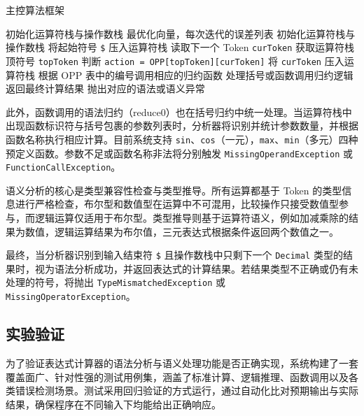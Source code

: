 \documentclass[a4paper, twoside, utf8]{ctexart}
\begin{document}
\begin{algorithm}
        \caption{主控算法框架}
        \begin{algorithmic}[1]
            \Require 初始化运算符栈与操作数栈
            \Ensure 最优化向量，每次迭代的误差列表
            \State 初始化运算符栈与操作数栈
            \State 将起始符号 \verb|$| 压入运算符栈
            \Loop
            \State 读取下一个 Token \verb|curToken|
            \State 获取运算符栈顶符号 \verb|topToken|
            \State 判断 \verb|action = OPP[topToken][curToken]|
            \State 将 \verb|curToken| 压入运算符栈
            \EndIf
            \State 根据 OPP 表中的编号调用相应的归约函数
            \EndIf
            \State 处理括号或函数调用归约逻辑
            \EndIf
            \State 返回最终计算结果
            \EndIf
            \State 抛出对应的语法或语义异常
            \EndIf
            \EndLoop
        \end{algorithmic}
    \end{algorithm}
    
    此外，函数调用的语法归约（reduce0）也在括号归约中统一处理。当运算符栈中出现函数标识符与括号包裹的参数列表时，分析器将识别并统计参数数量，并根据函数名称执行相应计算。目前系统支持 \verb|sin|、\verb|cos|（一元），\verb|max|、\verb|min|（多元）四种预定义函数。参数不足或函数名称非法将分别触发 \verb|MissingOperandException| 或 \verb|FunctionCallException|。
    
    语义分析的核心是类型兼容性检查与类型推导。所有运算都基于 Token 的类型信息进行严格检查，布尔型和数值型在运算中不可混用，比较操作只接受数值型参与，而逻辑运算仅适用于布尔型。类型推导则基于运算符语义，例如加减乘除的结果为数值，逻辑运算结果为布尔值，三元表达式根据条件返回两个数值之一。
    
    最终，当分析器识别到输入结束符 \verb|$| 且操作数栈中只剩下一个 \verb|Decimal| 类型的结果时，视为语法分析成功，并返回表达式的计算结果。若结果类型不正确或仍有未处理的符号，将抛出 \verb|TypeMismatchedException| 或 \verb|MissingOperatorException|。

    \subsection{实验验证}

    为了验证表达式计算器的语法分析与语义处理功能是否正确实现，系统构建了一套覆盖面广、针对性强的测试用例集，涵盖了标准计算、逻辑推理、函数调用以及各类错误检测场景。测试采用回归验证的方式运行，通过自动化比对预期输出与实际结果，确保程序在不同输入下均能给出正确响应。
\end{document}
